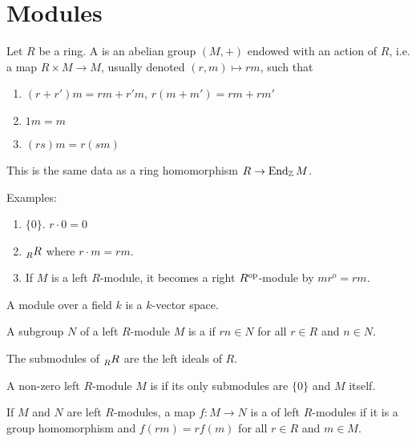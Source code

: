 \chapter{Modules}

  \begin{define}
    Let $R$ be a ring. A  is an abelian group
    $(M,+)$ endowed with an action of $R$, i.e. a map $R\times M \to M$,
    usually denoted $(r,m)\mapsto rm$, such that
    \begin{enumerate}
      \item $(r + r')m = rm+r'm$, $r(m+m') = rm+rm'$
      \item $1m = m$
      \item $(rs)m = r(sm)$
    \end{enumerate}
  \end{define}
  This is the same data as a ring homomorphism $R \to \operatorname{End}_{\mathbb{Z}} M$.

  Examples:
  \begin{enumerate}
    \item $\{0\}$. $r\cdot 0 = 0$
    \item $\prescript{}{R}{R}$ where $r\cdot m = rm$.
    \item If $M$ is a left $R$-module, it becomes a right $R^{\text{op}}$-module by
      $mr^o = rm$.
  \end{enumerate}

  \begin{prop}
    A module over a field $k$ is a $k$-vector space.
  \end{prop}

  \begin{define}
    A subgroup $N$ of a left $R$-module $M$ is a  if $rn\in N$
    for all $r\in R$ and $n\in N$.
  \end{define}

  The submodules of $\prescript{}{R}{R}$ are the left ideals of $R$.

  \begin{define}
    A non-zero left $R$-module $M$ is  if its only submodules are
    $\{0\}$ and $M$ itself.
  \end{define}

  \begin{define}
    If $M$ and $N$ are left $R$-modules, a map $f:M\to N$ is a
     of left $R$-modules if it is a group homomorphism
    and $f(rm) = rf(m)$ for all $r\in R$ and $m\in M$.
  \end{define}

